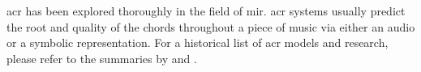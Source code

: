 

\gls{acr} has been explored thoroughly in the field of
\gls{mir}. \gls{acr} systems usually predict the root and
quality of the chords throughout a piece of music via either
an audio or a symbolic representation. For a historical list
of \gls{acr} models and research, please refer to the
summaries by \textcite{pauwels201920} and
\textcite{ju2021addressing}.
